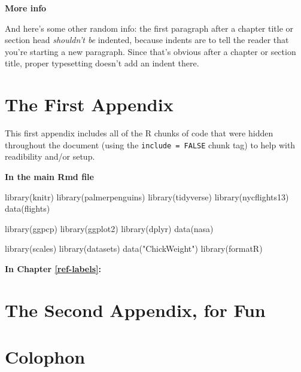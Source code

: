 \documentclass[print]{nuthesis}
\newenvironment{Shaded}{\begin{snugshade}}{\end{snugshade}}
\newcommand{\FunctionTok}[1]{\textcolor[rgb]{0.00,0.00,0.00}{#1}}
\newcommand{\NormalTok}[1]{#1}
\newcommand{\StringTok}[1]{\textcolor[rgb]{0.31,0.60,0.02}{#1}}
\begin{document}
\textbf{More info}

And here's some other random info: the first paragraph after a chapter title or section head \emph{shouldn't be} indented, because indents are to tell the reader that you're starting a new paragraph. Since that's obvious after a chapter or section title, proper typesetting doesn't add an indent there.

\appendix

\hypertarget{the-first-appendix}{%
\chapter{The First Appendix}\label{the-first-appendix}}

This first appendix includes all of the R chunks of code that were hidden throughout the document (using the \texttt{include\ =\ FALSE} chunk tag) to help with readibility and/or setup.

\textbf{In the main Rmd file}

\begin{Shaded}
\begin{Highlighting}[]
\FunctionTok{library}\NormalTok{(knitr)}
\FunctionTok{library}\NormalTok{(palmerpenguins)}
\FunctionTok{library}\NormalTok{(tidyverse)}
\FunctionTok{library}\NormalTok{(nycflights13)}
\FunctionTok{data}\NormalTok{(flights)}

\FunctionTok{library}\NormalTok{(ggpcp)}
\FunctionTok{library}\NormalTok{(ggplot2)}
\FunctionTok{library}\NormalTok{(dplyr)}
\FunctionTok{data}\NormalTok{(nasa)}

\FunctionTok{library}\NormalTok{(scales)}
\FunctionTok{library}\NormalTok{(datasets)}
\FunctionTok{data}\NormalTok{(}\StringTok{"ChickWeight"}\NormalTok{)}
\FunctionTok{library}\NormalTok{(formatR)}
\end{Highlighting}
\end{Shaded}

\textbf{In Chapter \ref{ref-labels}:}

\hypertarget{the-second-appendix-for-fun}{%
\chapter{The Second Appendix, for Fun}\label{the-second-appendix-for-fun}}

\hypertarget{colophon}{%
\chapter*{Colophon}\label{colophon}}
\end{document}
